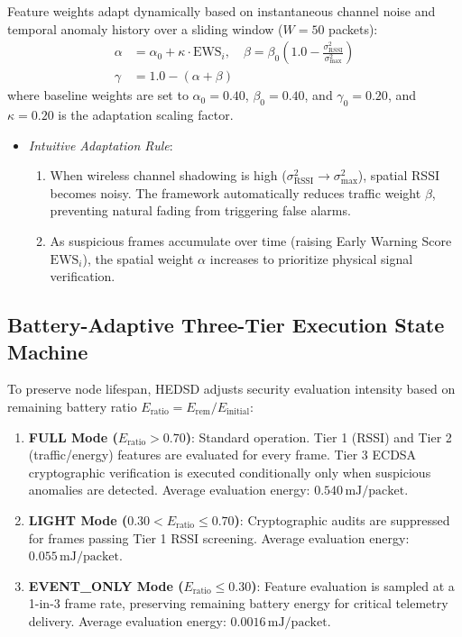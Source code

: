 \documentclass[conference]{IEEEtran}
\begin{document}
Feature weights adapt dynamically based on instantaneous channel noise and temporal anomaly history over a sliding window ($W=50$ packets):
\begin{equation}
\label{eq_dynamic_weights}
\begin{aligned}
\alpha &= \alpha_0 + \kappa \cdot \text{EWS}_i, \quad \beta = \beta_0 \left(1.0 - \frac{\sigma_{\text{RSSI}}^2}{\sigma_{\text{max}}^2}\right) \\
\gamma &= 1.0 - (\alpha + \beta)
\end{aligned}
\end{equation}
where baseline weights are set to $\alpha_0 = 0.40$, $\beta_0 = 0.40$, and $\gamma_0 = 0.20$, and $\kappa = 0.20$ is the adaptation scaling factor.
\begin{itemize}
    \item \textit{Intuitive Adaptation Rule}: 
    \begin{enumerate}
        \item When wireless channel shadowing is high ($\sigma_{\text{RSSI}}^2 \to \sigma_{\text{max}}^2$), spatial RSSI becomes noisy. The framework automatically reduces traffic weight $\beta$, preventing natural fading from triggering false alarms.
        \item As suspicious frames accumulate over time (raising Early Warning Score $\text{EWS}_i$), the spatial weight $\alpha$ increases to prioritize physical signal verification.
    \end{enumerate}
\end{itemize}

\subsection{Battery-Adaptive Three-Tier Execution State Machine}
To preserve node lifespan, HEDSD adjusts security evaluation intensity based on remaining battery ratio $E_{\text{ratio}} = E_{\text{rem}} / E_{\text{initial}}$:
\begin{enumerate}
    \item \textbf{FULL Mode ($E_{\text{ratio}} > 0.70$)}: Standard operation. Tier 1 (RSSI) and Tier 2 (traffic/energy) features are evaluated for every frame. Tier 3 ECDSA cryptographic verification is executed conditionally only when suspicious anomalies are detected. Average evaluation energy: $0.540\,\text{mJ/packet}$.
    \item \textbf{LIGHT Mode ($0.30 < E_{\text{ratio}} \le 0.70$)}: Cryptographic audits are suppressed for frames passing Tier 1 RSSI screening. Average evaluation energy: $0.055\,\text{mJ/packet}$.
    \item \textbf{EVENT\_ONLY Mode ($E_{\text{ratio}} \le 0.30$)}: Feature evaluation is sampled at a 1-in-3 frame rate, preserving remaining battery energy for critical telemetry delivery. Average evaluation energy: $0.0016\,\text{mJ/packet}$.
\end{enumerate}
\end{document}
